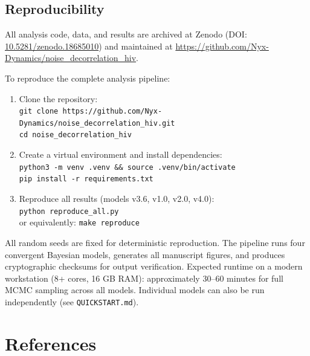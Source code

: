 \documentclass[11pt]{article}
\begin{document}
\subsection{Reproducibility}

All analysis code, data, and results are archived at Zenodo (DOI: \href{https://doi.org/10.5281/zenodo.18685010}{10.5281/zenodo.18685010}) and maintained at \url{https://github.com/Nyx-Dynamics/noise\_decorrelation\_hiv}.

To reproduce the complete analysis pipeline:

\begin{enumerate}
    \item Clone the repository: \\
    \texttt{git clone https://github.com/Nyx-Dynamics/noise\_decorrelation\_hiv.git} \\
    \texttt{cd noise\_decorrelation\_hiv}

    \item Create a virtual environment and install dependencies: \\
    \texttt{python3 -m venv .venv \&\& source .venv/bin/activate} \\
    \texttt{pip install -r requirements.txt}

    \item Reproduce all results (models v3.6, v1.0, v2.0, v4.0): \\
    \texttt{python reproduce\_all.py} \\
    or equivalently: \texttt{make reproduce}
\end{enumerate}

All random seeds are fixed for deterministic reproduction. The pipeline runs four convergent Bayesian models, generates all manuscript figures, and produces cryptographic checksums for output verification. Expected runtime on a modern workstation (8+ cores, 16 GB RAM): approximately 30--60 minutes for full MCMC sampling across all models. Individual models can also be run independently (see \texttt{QUICKSTART.md}).

\newpage
\section*{References}
\end{document}
